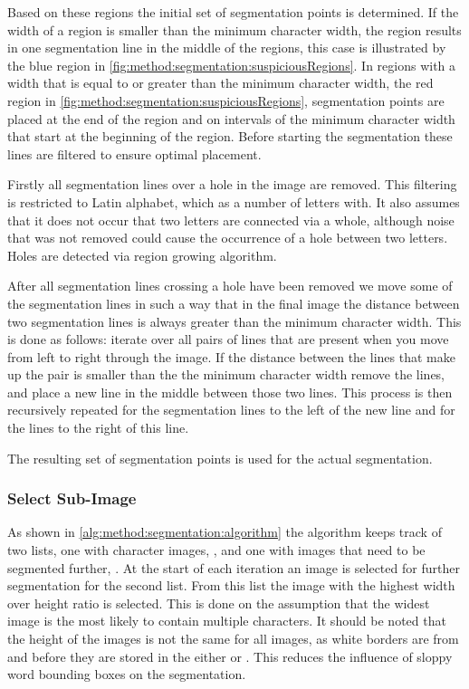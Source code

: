 	Based on these regions the initial set of segmentation points is determined. If the width of a region is smaller than the minimum character width, the region results in one segmentation line in the middle of the regions, this case is illustrated by the blue region in \cref{fig:method:segmentation:suspiciousRegions}. In regions with a width that is equal to or greater than the minimum character width, the red region in \cref{fig:method:segmentation:suspiciousRegions}, segmentation points are placed at the end of the region and on intervals of the minimum character width that start at the beginning of the region. Before starting the segmentation these lines are filtered to ensure optimal placement. 

	Firstly all segmentation lines over a hole in the image are removed. This filtering is restricted to Latin alphabet, which as a number of letters with. It also assumes that it  does not occur that two letters are connected via a whole, although noise that was not removed could cause the occurrence of a hole between two letters. Holes are detected via region growing algorithm. 

	After all segmentation lines crossing a hole have been removed we move some of the segmentation lines in such a way that in the final image the distance between two segmentation lines is always greater than the minimum character width. This is done as follows: iterate over all pairs of lines that are present when you move from left to right through the image. If the distance between the lines that make up the pair is smaller than the the minimum character width remove the lines, and place a new line in the middle between those two lines. This process is then recursively repeated for the segmentation lines to the left of the new line and for the lines to the right of this line. 


	The resulting set of segmentation points is used for the actual segmentation. 

\subsubsection{Select Sub-Image}
\label{sss:method:segmentaton:selectsubimage}
	As shown in \cref{alg:method:segmentation:algorithm} the algorithm keeps track of two lists, one with character images, \characters, and one with images that need to be segmented further, \segmentfurther. At the start of each iteration an image is selected for further segmentation for the second list. From this list the image with the highest width over height ratio is selected. This is done on the assumption that the widest image is the most likely to contain multiple characters. It should be noted that the height of the images is not the same for all images, as white borders are from \leftsubimage and \rightsubimage before they are stored in the either \characters or \segmentfurther. This reduces the influence of sloppy word bounding boxes on the segmentation.

